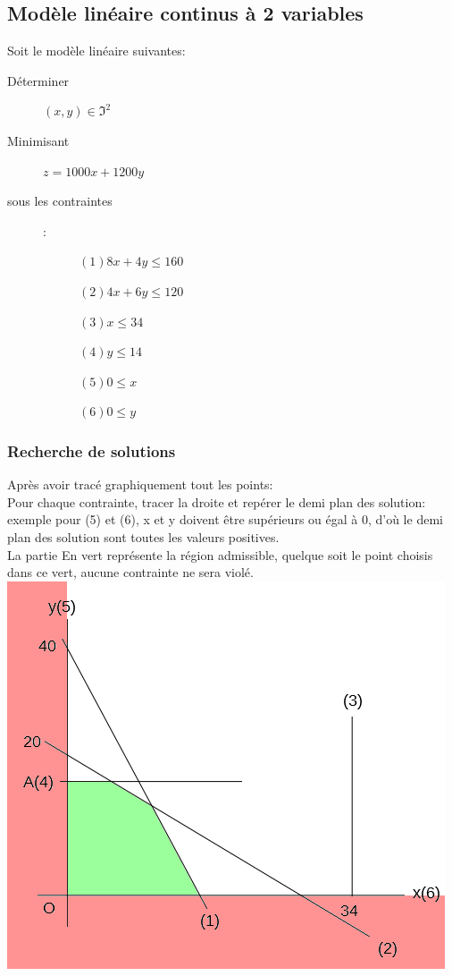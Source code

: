 \subsection{Modèle linéaire continus à 2 variables}
Soit le modèle linéaire suivantes:
\pagebreak
\begin{description}
\item[Déterminer] $(x,y) \in \Im^2$
\item[Minimisant] $z = 1000x + 1200y$
\item[sous les contraintes]:
\begin{description}
\item[] $(1) 8x + 4y \leq 160$
\item[] $(2) 4x + 6y \leq 120$
\item[] $(3) x \leq 34$
\item[] $(4) y \leq 14$
\item[] $(5) 0 \leq x$
\item[] $(6) 0 \leq y$
\end{description}
\end{description}

\subsubsection{Recherche de solutions}
Après avoir tracé graphiquement tout les points:\\
Pour chaque contrainte, tracer la droite et repérer le demi plan des solution: exemple pour (5) et (6), x et y doivent être supérieurs ou égal à 0, d'où le demi plan des solution sont toutes les valeurs positives.\\
La partie En vert représente la région admissible, quelque soit le point choisis dans ce vert, aucune contrainte ne sera violé.\\
\includegraphics[scale=0.55]{img/ro-pl-2var_0.png} 

